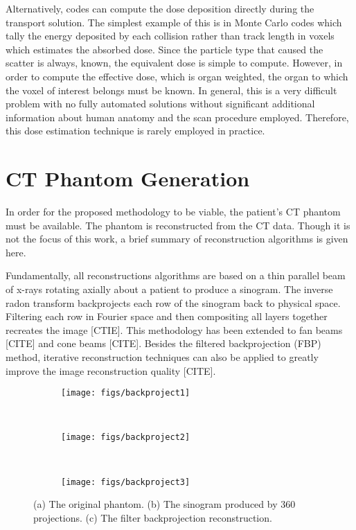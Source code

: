 Alternatively, codes can compute the dose deposition directly during the transport solution. The simplest example of this is in Monte Carlo codes which tally the energy deposited by each collision rather than track length in voxels which estimates the absorbed dose. Since the particle type that caused the scatter is always, known, the equivalent dose is simple to compute. However, in order to compute the effective dose, which is organ weighted, the organ to which the voxel of interest belongs must be known. In general, this is a very difficult problem with no fully automated solutions without significant additional information about human anatomy and the scan procedure employed. Therefore, this dose estimation technique is rarely employed in practice.

\section{CT Phantom Generation}

In order for the proposed methodology to be viable, the patient's CT phantom must be available. The phantom is reconstructed from the CT data. Though it is not the focus of this work, a brief summary of reconstruction algorithms is given here.

Fundamentally, all reconstructions algorithms are based on a thin parallel beam of x-rays rotating axially about a patient to produce a sinogram. The inverse radon transform backprojects each row of the sinogram back to physical space. Filtering each row in Fourier space and then compositing all layers together recreates the image [CTIE]. This methodology has been extended to fan beams [CITE] and cone beams [CITE]. Besides the filtered backprojection (FBP) method, iterative reconstruction techniques can also be applied to greatly improve the image reconstruction quality [CITE].

\begin{figure}
    \centering
    \begin{subfigure}[b]{0.38\textwidth}
        \texttt{[image: figs/backproject1]}
        \caption{}
        \label{fig:beamconexy}
    \end{subfigure}
    ~
    \begin{subfigure}[b]{0.19\textwidth}
        \texttt{[image: figs/backproject2]}
        \caption{}
        \label{fig:beamfanxy}
    \end{subfigure}
    ~
    \begin{subfigure}[b]{0.38\textwidth}
        \texttt{[image: figs/backproject3]}
        \caption{}
        \label{fig:subsweep_general3}
    \end{subfigure}
    \caption{(a) The original phantom. (b) The sinogram produced by 360 projections. (c) The filter backprojection reconstruction.}\label{fig:backprojection}
\end{figure}

